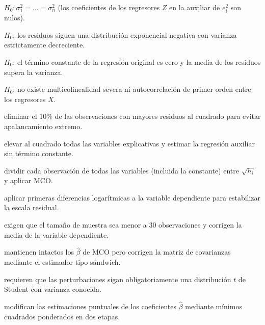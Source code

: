\begin{opts}
    \item $H_0: \sigma_1^2 = \dots = \sigma_n^2$ (los coeficientes de los regresores $Z$ en la auxiliar de $e_i^2$ son nulos).
    \item $H_0$: los residuos siguen una distribución exponencial negativa con varianza estrictamente decreciente.
    \item $H_0$: el término constante de la regresión original es cero y la media de los residuos supera la varianza.
    \item $H_0$: no existe multicolinealidad severa ni autocorrelación de primer orden entre los regresores $X$.
\end{opts}

\begin{opts}
    \item eliminar el $10\%$ de las observaciones con mayores residuos al cuadrado para evitar apalancamiento extremo.
    \item elevar al cuadrado todas las variables explicativas y estimar la regresión auxiliar sin término constante.
    \item dividir cada observación de todas las variables (incluida la constante) entre $\sqrt{h_i}$ y aplicar MCO.
    \item aplicar primeras diferencias logarítmicas a la variable dependiente para estabilizar la escala residual.
\end{opts}

\begin{opts}
    \item exigen que el tamaño de muestra sea menor a 30 observaciones y corrigen la media de la variable dependiente.
    \item mantienen intactos los $\hat{\beta}$ de MCO pero corrigen la matriz de covarianzas mediante el estimador tipo sándwich.
    \item requieren que las perturbaciones sigan obligatoriamente una distribución $t$ de Student con varianza conocida.
    \item modifican las estimaciones puntuales de los coeficientes $\hat{\beta}$ mediante mínimos cuadrados ponderados en dos etapas.
\end{opts}

